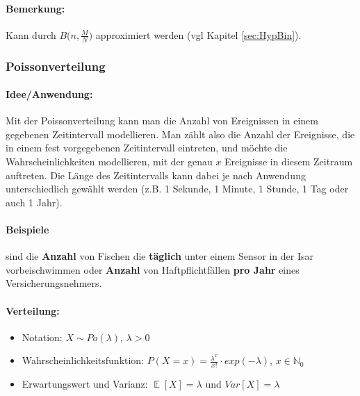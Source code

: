 \documentclass[a4paper]{article}
\DeclareMathOperator*{\E}{\mathbb{E}}
\begin{document}
\paragraph{Bemerkung:} Kann durch $B\Big(n,\frac{M}{N}\Big)$ approximiert werden (vgl Kapitel \ref{sec:HypBin}).\\

\noindent {}

\subsubsection{Poissonverteilung} \label{sec:Poi}

\paragraph{Idee/Anwendung:} Mit der Poissonverteilung kann man die Anzahl von Ereignissen in einem gegebenen Zeitintervall modellieren. Man zählt also die Anzahl der Ereignisse, die in einem fest vorgegebenen Zeitintervall eintreten, und möchte die Wahrscheinlichkeiten modellieren, mit der genau $x$ Ereignisse in diesem Zeitraum auftreten. Die Länge des Zeitintervalls kann dabei je nach Anwendung unterschiedlich gewählt werden (z.B. 1 Sekunde, 1 Minute, 1 Stunde, 1 Tag oder auch 1 Jahr).

\paragraph{Beispiele} sind die \textbf{Anzahl} von Fischen die \textbf{täglich} unter einem Sensor in der Isar vorbeischwimmen oder \textbf{Anzahl} von Haftpflichtfällen \textbf{pro Jahr} eines Versicherungsnehmers. 

\paragraph{Verteilung:}
\begin{itemize}
\item[] Notation: $X\sim Po(\lambda)$, $\lambda > 0$
\item[] Wahrscheinlichkeitsfunktion: $P(X=x)=\frac{\lambda^x}{x!}\cdot exp(-\lambda)$, $x \in \mathbb{N}_0$
\item[] Erwartungswert und Varianz: $\E[X]=\lambda$ und $Var[X]=\lambda$
\end{itemize}
\end{document}
